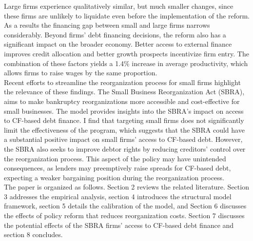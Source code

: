 \documentclass[12pt]{article}
\begin{document}
Large firms experience qualitatively similar, but much smaller changes, since these firms are unlikely to liquidate even before the implementation of the reform. As a results the financing gap between small and large firms narrows considerably. Beyond firms' debt financing decisions, the reform also has a significant impact on the broader economy. Better access to external finance improves credit allocation and better growth prospects incentivize firm entry. The combination of these factors yields a 1.4\% increase in average productivity, which allows firms to raise wages by the same proportion. \vspace{3mm} \\
Recent efforts to streamline the reorganization process for small firms highlight the relevance of these findings. The Small Business Reorganization Act (SBRA), aims to make bankruptcy reorganizations more accessible and cost-effective for small businesses. The model provides insights into the SBRA’s impact on access to CF-based debt finance. I find that targeting small firms does not significantly limit the effectiveness of the program, which suggests that the SBRA could have a substantial positive impact on small firms' access to CF-based debt. However, the SBRA also seeks to improve debtor rights by reducing creditors' control over the reorganization process. This aspect of the policy may have unintended consequences, as lenders may preemptively raise spreads for CF-based debt, expecting a weaker bargaining position during the reorganization process. \vspace{3mm} \\ 
The paper is organized as follows. Section 2 reviews the related literature. Section 3 addresses the empirical analysis, section 4 introduces the structural model framework, section 5 details the calibration of the model, and Section 6 discusses the effects of policy reform that reduces reorganization costs. Section 7 discusses the potential effects of the SBRA firms' access to CF-based debt finance and section 8 concludes.
\end{document}

